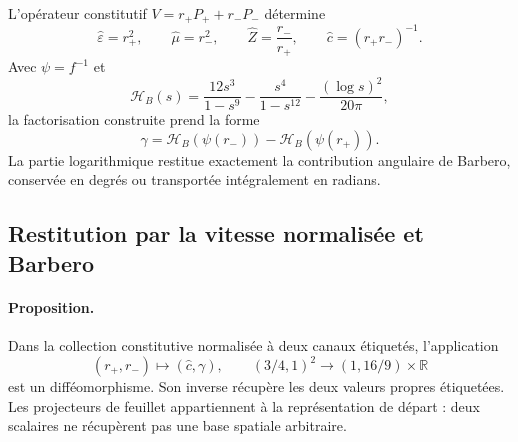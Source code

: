 L’opérateur constitutif $V=r_+P_++r_-P_-$ détermine
\begin{equation}
 \widehat\varepsilon=r_+^2,\qquad \widehat\mu=r_-^2,
 \qquad \widehat Z=\frac{r_-}{r_+},\qquad
 \widehat c=(r_+r_-)^{-1}.
 \label{md:compos:lectores-constitutivos}
\end{equation}
Avec $\psi=f^{-1}$ et
\begin{equation}
 \mathcal H_B(s)=\frac{12s^3}{1-s^9}
 -\frac{s^4}{1-s^{12}}-\frac{(\log s)^2}{20\pi},
 \label{md:compos:h-barbero}
\end{equation}
la factorisation construite prend la forme
\begin{equation}
 \gamma=\mathcal H_B(\psi(r_-))-\mathcal H_B(\psi(r_+)).
 \label{md:compos:factorizacion-barbero}
\end{equation}
La partie logarithmique restitue exactement la contribution angulaire de
Barbero, conservée en degrés ou transportée intégralement en radians.

\subsection{Restitution par la vitesse normalisée et Barbero}
\label{md:compos:difeomorfismo}

\paragraph{Proposition.}
Dans la collection constitutive normalisée à deux canaux étiquetés, l’application
\begin{equation}
 (r_+,r_-)\longmapsto(\widehat c,\gamma),\qquad
 (3/4,1)^2\longrightarrow(1,16/9)\times\mathbb R
 \label{md:compos:mapa-global}
\end{equation}
est un difféomorphisme. Son inverse récupère les deux valeurs propres étiquetées.
Les projecteurs de feuillet appartiennent à la représentation de départ : deux
scalaires ne récupèrent pas une base spatiale arbitraire.


